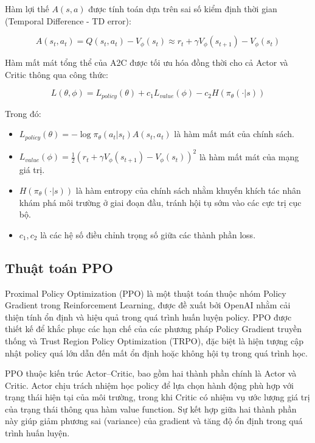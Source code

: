 Hàm lợi thế $A(s, a)$ được tính toán dựa trên sai số kiểm định thời gian (Temporal Difference - TD error):

\begin{equation}
A(s_t, a_t) = Q(s_t, a_t) - V_\phi(s_t) \approx r_t + \gamma V_\phi(s_{t+1}) - V_\phi(s_t)
\end{equation}

Hàm mất mát tổng thể của A2C được tối ưu hóa đồng thời cho cả Actor và Critic thông qua công thức:

\begin{equation}
L(\theta, \phi) = L_{policy}(\theta) + c_1 L_{value}(\phi) - c_2 H(\pi_\theta(\cdot|s))
\end{equation}

Trong đó:
\begin{itemize}
    \item $L_{policy}(\theta) = -\log \pi_\theta(a_t|s_t) A(s_t, a_t)$ là hàm mất mát của chính sách.
    \item $L_{value}(\phi) = \frac{1}{2} \left( r_t + \gamma V_\phi(s_{t+1}) - V_\phi(s_t) \right)^2$ là hàm mất mát của mạng giá trị.
    \item $H(\pi_\theta(\cdot|s))$ là hàm entropy của chính sách nhằm khuyến khích tác nhân khám phá môi trường ở giai đoạn đầu, tránh hội tụ sớm vào các cực trị cục bộ.
    \item $c_1, c_2$ là các hệ số điều chỉnh trọng số giữa các thành phần loss.
\end{itemize}

\subsection{Thuật toán PPO}

Proximal Policy Optimization (PPO) là một thuật toán thuộc nhóm Policy Gradient trong Reinforcement Learning, được đề xuất bởi OpenAI nhằm cải thiện tính ổn định và hiệu quả trong quá trình huấn luyện policy. PPO được thiết kế để khắc phục các hạn chế của các phương pháp Policy Gradient truyền thống và Trust Region Policy Optimization (TRPO), đặc biệt là hiện tượng cập nhật policy quá lớn dẫn đến mất ổn định hoặc không hội tụ trong quá trình học.

PPO thuộc kiến trúc Actor--Critic, bao gồm hai thành phần chính là Actor và Critic. Actor chịu trách nhiệm học policy để lựa chọn hành động phù hợp với trạng thái hiện tại của môi trường, trong khi Critic có nhiệm vụ ước lượng giá trị của trạng thái thông qua hàm value function. Sự kết hợp giữa hai thành phần này giúp giảm phương sai (variance) của gradient và tăng độ ổn định trong quá trình huấn luyện.

